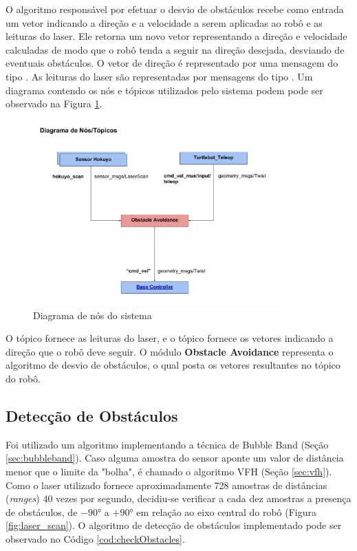 O algoritmo responsável por efetuar o desvio de obstáculos recebe como
entrada um vetor indicando a direção e a velocidade a serem aplicadas
ao robô e as leituras do laser. Ele retorna um novo vetor
representando a direção e velocidade calculadas de modo que o robô
tenda a seguir na direção desejada, desviando de eventuais obstáculos.
O vetor de direção é representado por uma mensagem do tipo
. As leituras do laser são representadas
por mensagens do tipo . Um diagrama
contendo os nós e tópicos utilizados pelo sistema podem pode ser
observado na Figura \ref{fig:diag_proj_ros}.

\begin{figure}[H]
    \centering
    \includegraphics[width=0.85\textwidth]{img/Diagrama_Projeto_ROS.pdf}
    \caption{Diagrama de nós do sistema}
    \label{fig:diag_proj_ros}
\end{figure}

O tópico  fornece as leituras do laser, e o tópico
 fornece os vetores indicando a direção que
o robô deve seguir. O módulo \textbf{Obstacle Avoidance} representa o
algoritmo de desvio de obstáculos, o qual posta os vetores resultantes
no tópico  do robô.

\subsection{Detecção de Obstáculos}

Foi utilizado um algoritmo implementando a técnica de Bubble Band  (Seção \ref{sec:bubbleband}). Caso alguma amostra do sensor aponte um valor
de distância menor que o limite da "bolha", é chamado o algoritmo VFH (Seção \ref{sec:vfh}). Como o
laser utilizado fornece aproximadamente 728 amostras de distâncias
(\textit{ranges}) 40 vezes por segundo, decidiu-se verificar a cada
dez amostras a presença de obstáculos, de $-90°$ a $+90°$ em relação
ao eixo central do robô (Figura \ref{fig:laser_scan}). O algoritmo de
detecção de obstáculos implementado pode ser observado no Código
\ref{cod:checkObstacles}.

